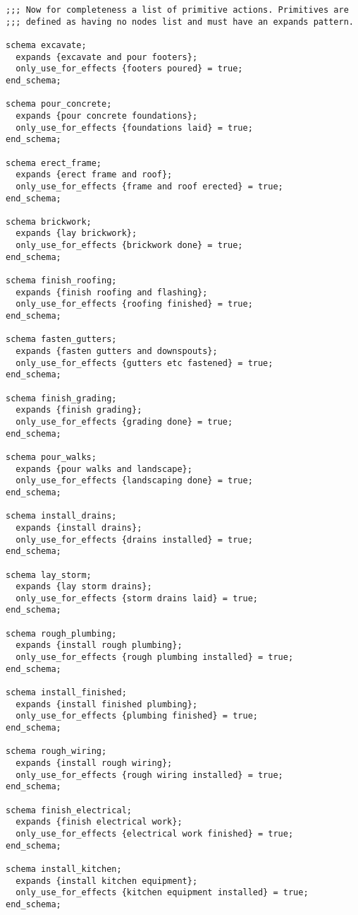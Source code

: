 \begin{verbatim}
;;; Now for completeness a list of primitive actions. Primitives are
;;; defined as having no nodes list and must have an expands pattern.

schema excavate;
  expands {excavate and pour footers};
  only_use_for_effects {footers poured} = true;
end_schema;

schema pour_concrete;
  expands {pour concrete foundations};
  only_use_for_effects {foundations laid} = true;
end_schema;

schema erect_frame;
  expands {erect frame and roof};
  only_use_for_effects {frame and roof erected} = true;
end_schema;

schema brickwork;
  expands {lay brickwork};
  only_use_for_effects {brickwork done} = true;
end_schema;

schema finish_roofing;
  expands {finish roofing and flashing};
  only_use_for_effects {roofing finished} = true;
end_schema;

schema fasten_gutters;
  expands {fasten gutters and downspouts};
  only_use_for_effects {gutters etc fastened} = true;
end_schema;

schema finish_grading;
  expands {finish grading};
  only_use_for_effects {grading done} = true;
end_schema;

schema pour_walks;
  expands {pour walks and landscape};
  only_use_for_effects {landscaping done} = true;
end_schema;

schema install_drains;
  expands {install drains};
  only_use_for_effects {drains installed} = true;
end_schema;

schema lay_storm;
  expands {lay storm drains};
  only_use_for_effects {storm drains laid} = true;
end_schema;

schema rough_plumbing;
  expands {install rough plumbing};
  only_use_for_effects {rough plumbing installed} = true;
end_schema;

schema install_finished;
  expands {install finished plumbing};
  only_use_for_effects {plumbing finished} = true;
end_schema;

schema rough_wiring;
  expands {install rough wiring};
  only_use_for_effects {rough wiring installed} = true;
end_schema;

schema finish_electrical;
  expands {finish electrical work};
  only_use_for_effects {electrical work finished} = true;
end_schema;

schema install_kitchen;
  expands {install kitchen equipment};
  only_use_for_effects {kitchen equipment installed} = true;
end_schema;


\end{verbatim}

